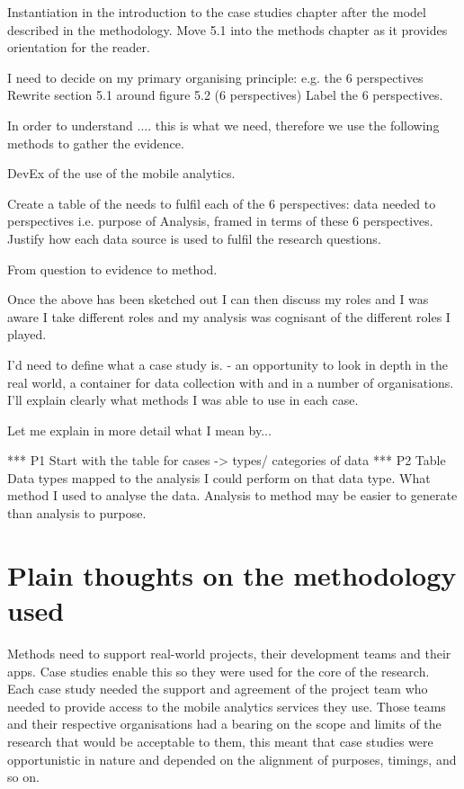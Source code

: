 Instantiation in the introduction to the case studies chapter after the model described in the methodology.
Move 5.1 into the methods chapter as it provides orientation for the reader.

I need to decide on my primary organising principle: e.g. the 6 perspectives
Rewrite section 5.1 around figure 5.2 (6 perspectives) Label the 6 perspectives.

In order to understand .... this is what we need, therefore we use the following methods to gather the evidence.

DevEx of the use of the mobile analytics. 

Create a table of the needs to fulfil each of the 6 perspectives: data needed to perspectives i.e. purpose of Analysis, framed in terms of these 6 perspectives. 
Justify how each data source is used to fulfil the research questions. 

From question to evidence to method.

Once the above has been sketched out I can then discuss my roles and I was aware I take different roles and my analysis was cognisant of the different roles I played.

I'd need to define what a case study is. - an opportunity to look in depth in the real world, a container for data collection with and in a number of organisations. I'll explain clearly what methods I was able to use in each case. 

Let me explain in more detail what I mean by... 

*** P1 Start with the table for cases -> types/ categories of data 
*** P2 Table Data types mapped to the analysis I could perform on that data type. What method I used to analyse the data.
Analysis to method may be easier to generate than analysis to purpose.


\section*{Plain thoughts on the methodology used}
Methods need to support real-world projects, their development teams and their apps. Case studies enable this so they were used for the core of the research. Each case study needed the support and agreement of the project team who needed to provide access to the mobile analytics services they use. Those teams and their respective organisations had a bearing on the scope and limits of the research that would be acceptable to them, this meant that case studies were opportunistic in nature and depended on the alignment of purposes, timings, and so on.

